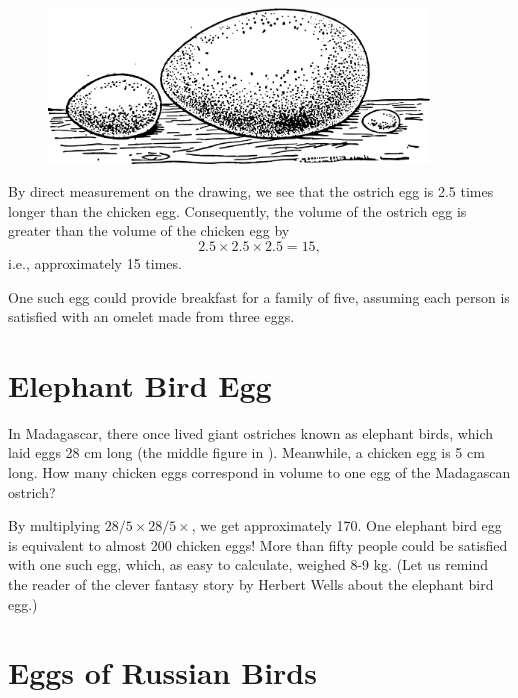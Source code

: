 \begin{figure}[h!]
\centering
\includegraphics[width=0.9\textwidth]{figures/ch-11/fig-167.pdf}
\end{figure}

\ans By direct measurement on the drawing, we see that the ostrich egg is 2.5 times longer than the chicken egg. Consequently, the volume of the ostrich egg is greater than the volume of the chicken egg by
\begin{equation*}%
2.5 \times 2.5 \times 2.5 = 15, 
\end{equation*}
i.e., approximately 15 times.

One such egg could provide breakfast for a family of five, assuming each person is satisfied with an omelet made from three eggs.

\section{Elephant Bird Egg}
\label{sec-11.7}


\ques In Madagascar, there once lived giant ostriches known as elephant birds, which laid eggs 28 cm long (the middle figure in ). Meanwhile, a chicken egg is 5 cm long. How many chicken eggs correspond in volume to one egg of the Madagascan ostrich?


\ans By multiplying \( 28/5 \times 28/5 \times \), we get approximately 170. One elephant bird egg is equivalent to almost 200 chicken eggs! More than fifty people could be satisfied with one such egg, which, as easy to calculate, weighed 8-9 kg. (Let us remind the reader of the clever fantasy story by Herbert Wells about the elephant bird egg.)

\section{Eggs of Russian Birds}
\label{sec-11.8}



